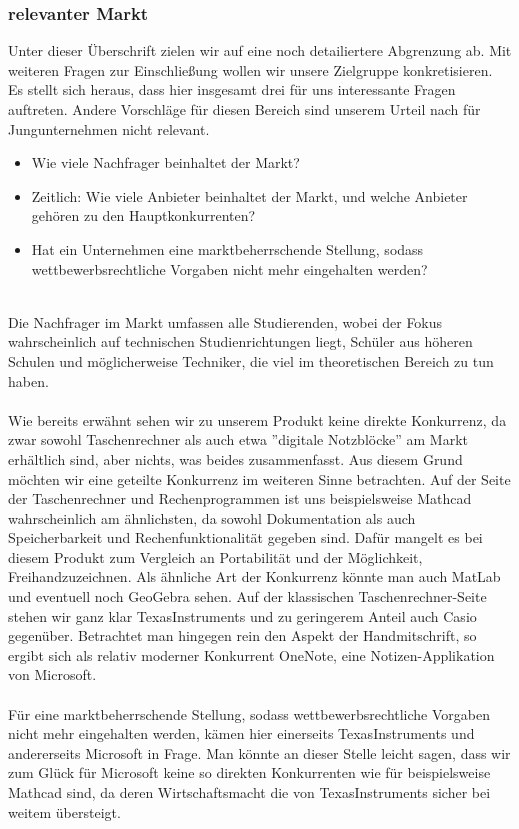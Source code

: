 \subsubsection{relevanter Markt}
Unter dieser Überschrift zielen wir auf eine noch detailiertere Abgrenzung ab. Mit weiteren Fragen zur Einschließung wollen wir unsere Zielgruppe konkretisieren.\\
Es stellt sich heraus, dass hier insgesamt drei für uns interessante Fragen auftreten. Andere Vorschläge für diesen Bereich sind unserem Urteil nach für Jungunternehmen nicht relevant.\\

\begin{itemize}
	\item Wie viele Nachfrager beinhaltet der Markt?
	\item Zeitlich: Wie viele Anbieter beinhaltet der Markt, und welche Anbieter gehören zu den Hauptkonkurrenten?
	\item Hat ein Unternehmen eine marktbeherrschende Stellung, sodass wettbewerbsrechtliche Vorgaben nicht mehr eingehalten werden?
\end{itemize}
\ \\
Die Nachfrager im Markt umfassen alle Studierenden, wobei der Fokus wahrscheinlich auf technischen Studienrichtungen liegt, Schüler aus höheren Schulen und möglicherweise Techniker, die viel im theoretischen Bereich zu tun haben.\\
\\
Wie bereits erwähnt sehen wir zu unserem Produkt keine direkte Konkurrenz, da zwar sowohl Taschenrechner als auch etwa ''digitale Notzblöcke'' am Markt erhältlich sind, aber nichts, was beides zusammenfasst. Aus diesem Grund möchten wir eine geteilte Konkurrenz im weiteren Sinne betrachten. Auf der Seite der Taschenrechner und Rechenprogrammen ist uns beispielsweise Mathcad wahrscheinlich am ähnlichsten, da sowohl Dokumentation als auch Speicherbarkeit und Rechenfunktionalität gegeben sind. Dafür mangelt es bei diesem Produkt zum Vergleich an Portabilität und der Möglichkeit, Freihandzuzeichnen. Als ähnliche Art der Konkurrenz könnte man auch MatLab und eventuell noch GeoGebra sehen. Auf der klassischen Taschenrechner-Seite stehen wir ganz klar TexasInstruments und zu geringerem Anteil auch Casio gegenüber. Betrachtet man hingegen rein den Aspekt der Handmitschrift, so ergibt sich als relativ moderner Konkurrent OneNote, eine Notizen-Applikation von Microsoft.\\
\\
Für eine marktbeherrschende Stellung, sodass wettbewerbsrechtliche Vorgaben nicht mehr eingehalten werden, kämen hier einerseits TexasInstruments und andererseits Microsoft in Frage. Man könnte an dieser Stelle leicht sagen, dass wir zum Glück für Microsoft keine so direkten Konkurrenten wie für beispielsweise Mathcad sind, da deren Wirtschaftsmacht die von TexasInstruments sicher bei weitem übersteigt.\\


